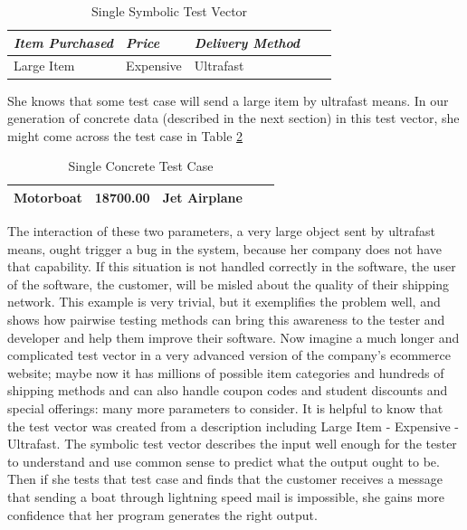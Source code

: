 \begin{table}[h!]
\centering
\begin{tabular}{@{} *5l @{}}    \toprule
\emph{Item Purchased} & \emph{Price} & \emph{Delivery Method}  \\\midrule
Large Item & Expensive & Ultrafast \\\bottomrule
 \hline
\end{tabular}
\caption{Single Symbolic Test Vector}
\label{table:testv}
\end{table}

She knows that some test case will send a large item by ultrafast means. In our generation of concrete data (described in the next section) in this test vector, she might come across the test case in Table \ref{table:conctc}

\begin{table}[h!]
\centering
\begin{tabular}{@{} *5l @{}}    \toprule
Motorboat & 18700.00 & Jet Airplane \\\bottomrule
 \hline
\end{tabular}
\caption{Single Concrete Test Case}
\label{table:conctc}
\end{table}

The interaction of these two parameters, a very large object sent by ultrafast means, ought trigger a bug in the system, because her company does not have that capability. If this situation is not handled correctly in the software, the user of the software, the customer, will be misled about the quality of their shipping network. This example is very trivial, but it exemplifies the problem well, and shows how pairwise testing methods can bring this awareness to the tester and developer and help them improve their software. Now imagine a much longer and complicated test vector in a very advanced version of the company's ecommerce website; maybe now it has millions of possible item categories and hundreds of shipping methods and can also handle coupon codes and student discounts and special offerings: many more parameters to consider. It is helpful to know that the test vector was created from a description including Large Item - Expensive - Ultrafast. The symbolic test vector describes the input well enough for the tester to understand and use common sense to predict what the output ought to be. Then if she tests that test case and finds that the customer receives a message that sending a boat through lightning speed mail is impossible, she gains more confidence that her program generates the right output.

